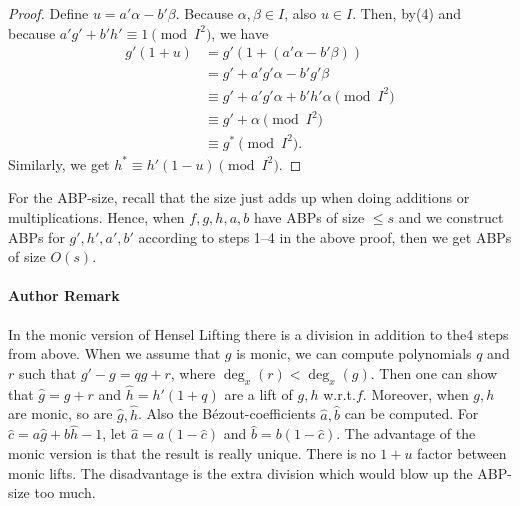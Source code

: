 \begin{proof}
Define $u=a'\alpha-b'\beta$. Because $\alpha,\beta\in I$, also $u\in I$. Then, by(4) and because $a'g'+b'h'\equiv1\pmod{I^2}$, we have
\begin{align*}g'(1+u)&=g'(1+(a'\alpha-b'\beta))\\&=g'+a'g'\alpha-b'g'\beta\\&\equiv g'+a'g'\alpha+b'h'\alpha\pmod{I^2}\\&\equiv g'+\alpha\pmod{I^2}\\&\equiv g^*\pmod{I^2}.\end{align*}
Similarly, we get $h^*\equiv h'(1-u)\pmod{I^2}$.
\end{proof}
For the ABP-size, recall that the size just adds up when doing additions or multiplications. Hence, when $f,g,h,a,b$ have ABPs of size $\leq s$ and we construct ABPs for $g',h',a',b'$ according to steps 1--4 in the above proof, then we get ABPs of size $O(s)$.
\paragraph{Author Remark}
In the monic version of Hensel Lifting there is a division in addition to the4 steps from above. When we assume that $g$ is monic, we can compute polynomials $q$ and $r$ such that $g'-g=qg+r$, where $\deg_x(r)<\deg_x(g)$. Then one can show that $\widehat g=g+r$ and $\widehat h=h'(1+q)$ are a lift of $g,h$ w.r.t.$f$. Moreover, when $g,h$ are monic, so are $\widehat g,\widehat h$. Also the B\'ezout-coefficients $\widehat a,\widehat b$ can be computed. For $\widehat c=a\widehat g+b\widehat h-1$, let $\widehat a=a(1-\widehat c)$ and $\widehat b=b(1-\widehat c)$.
The advantage of the monic version is that the result is really unique. There is no $1+u$ factor between monic lifts. The disadvantage is the extra division which would blow up the ABP-size too much.
